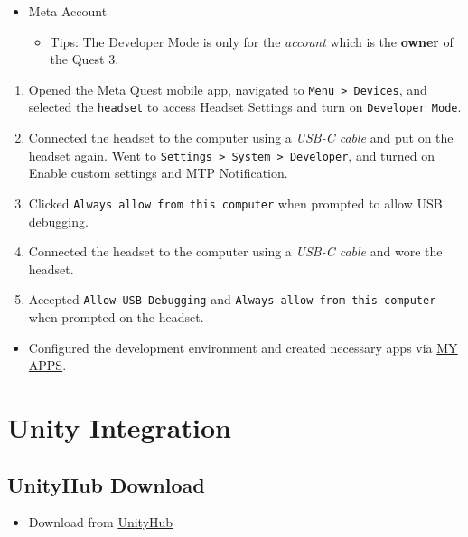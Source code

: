 \documentclass{article}
\begin{document}
\begin{itemize}
    \item Meta Account
    \begin{itemize}
        \item Tips: The Developer Mode is only for the \textit{account} which is the \textbf{owner} of the Quest 3.
    \end{itemize}
\end{itemize}

\begin{enumerate}
    \item Opened the Meta Quest mobile app, navigated to \texttt{Menu > Devices}, and selected the \texttt{headset} to access Headset Settings and turn on \texttt{Developer Mode}.
    \item Connected the headset to the computer using a \textit{USB-C cable} and put on the headset again. Went to \texttt{Settings > System > Developer}, and turned on Enable custom settings and MTP Notification.
    \item Clicked \texttt{Always allow from this computer} when prompted to allow USB debugging.
    \item Connected the headset to the computer using a \textit{USB-C cable} and wore the headset.
    \item Accepted \texttt{Allow USB Debugging} and \texttt{Always allow from this computer} when prompted on the headset.
\end{enumerate}

\begin{itemize}
    \item Configured the development environment and created necessary apps via \href{https://developer.oculus.com/manage/}{MY APPS}.
\end{itemize}

\section{Unity Integration}

\subsection{UnityHub Download}

\begin{itemize}
    \item Download from \href{https://unity.com/cn/download}{UnityHub}
\end{itemize}
\end{document}
